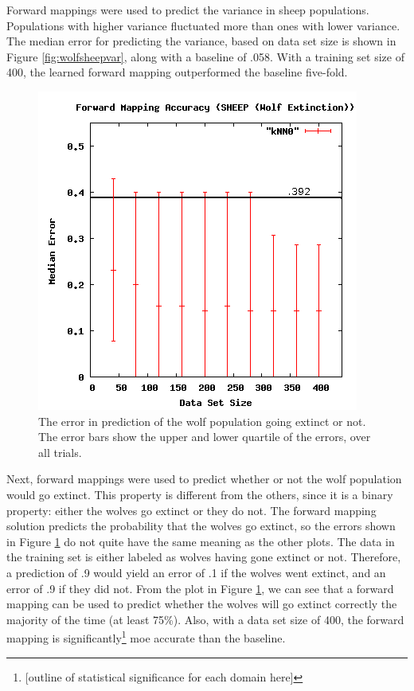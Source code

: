 Forward mappings were used to predict the variance in sheep populations.
Populations with higher variance fluctuated more than ones with lower variance.
The median error for predicting the variance, based on data set size is shown in Figure \ref{fig:wolfsheepvar}, along with a baseline of .058.
With a training set size of 400, the learned forward mapping outperformed the baseline five-fold.

\begin{figure}[ht]
\centering
\includegraphics[scale=.5]{images/results_wolfsheep/fm-wolf-extict.png}
\caption{The error in prediction of the wolf population going extinct or not.
The error bars show the upper and lower quartile of the errors, over all trials.}
\label{fig:wolfsheepextinct}
\end{figure}

Next, forward mappings were used to predict whether or not the wolf population would go extinct.
This property is different from the others, since it is a binary property: either the wolves go extinct or they do not.
The forward mapping solution predicts the probability that the wolves go extinct, so the errors shown in Figure \ref{fig:wolfsheepextinct} do not quite have the same meaning as the other plots.
The data in the training set is either labeled as wolves having gone extinct or not.
Therefore, a prediction of .9 would yield an error of .1 if the wolves went extinct, and an error of .9 if they did not.
From the plot in Figure \ref{fig:wolfsheepextinct}, we can see that a forward mapping can be used to predict whether the wolves will go extinct correctly the majority of the time (at least 75\%).
Also, with a data set size of 400, the forward mapping is significantly\footnote{[outline of statistical significance for each domain here]} moe accurate than the baseline.

